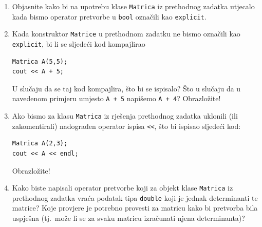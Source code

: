 \begin{razmisljanje}
    \begin{enumerate}
        \item
        Objasnite kako bi na upotrebu klase \texttt{Matrica} iz prethodnog zadatka
        utjecalo kada bismo operator pretvorbe u \texttt{bool}
        označili kao \texttt{explicit}.
        \item 
        Kada konstruktor \texttt{Matrice} u prethodnom zadatku ne bismo
        označili kao \texttt{explicit},
        bi li se sljedeći kod kompajlirao
        \begin{verbatim}
Matrica A(5,5);
cout << A + 5;   
        \end{verbatim}
    U slučaju da se taj kod kompajlira, što bi se ispisalo?
    Što u slučaju da u navedenom primjeru umjesto \texttt{A + 5} napišemo \texttt{A + 4}?
    Obrazložite!
        \item 
        Ako bismo za klasu \texttt{Matrica} iz rješenja prethodnog zadatka
        uklonili (ili zakomentirali) nadograđen operator ispisa \texttt{<\!<},
        što bi ispisao sljedeći kod:
        \begin{verbatim}
Matrica A(2,3);
cout << A << endl;
        \end{verbatim}
        Obrazložite!
        \item 
        Kako biste napisali operator pretvorbe koji za objekt klase \texttt{Matrica}
        iz prethodnog zadatka vraća podatak
        tipa \texttt{double}
        koji je jednak determinanti te matrice?
        Koje provjere je potrebno provesti za matricu kako bi pretvorba bila uspješna
        (tj.\ može li se za svaku matricu izračunati njena determinanta)?
    \end{enumerate}
\end{razmisljanje}